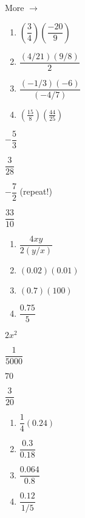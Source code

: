 \documentclass[11pt]{article}
\newcommand{\ds}{\displaystyle}
\begin{document}
\hfill More $\longrightarrow$

\newpage
\begin{multicols}{4}
\begin{enumerate}
\setcounter{enumi}{\theenumCount}
\item $\left(\dfrac{3}{4} \right) \left( \dfrac{-20}{9} \right)$
\item $\dfrac{(4/21)(9/8)}{2}$
\item $\dfrac{(-1/3)(-6)}{(-4/7)}$
\item $\ds \left(\frac{15}{8} \right) \left( \frac{44}{25} \right)$
\setcounter{enumCount}{\theenumi}
\end{enumerate}
\end{multicols}

\begin{multicols}{4}
\color{blue}
\begin{description}
\item \center $-\dfrac{5}{3}$
\item \center $\dfrac{3}{28}$
\item \center $-\dfrac{7}{2}$ (repeat!)
\item \center $\dfrac{33}{10}$
\setcounter{enumCount}{\theenumi}
\end{description}
\end{multicols}
\vfill

\begin{multicols}{4}
\begin{enumerate}
\setcounter{enumi}{\theenumCount}
\item $\dfrac{4xy}{2(y/x)}$
\item $(0.02)(0.01)$
\item $(0.7)(100)$
\item $\dfrac{0.75}{ 5 }$
\setcounter{enumCount}{\theenumi}
\end{enumerate}
\end{multicols}

\begin{multicols}{4}
\color{blue}
\begin{description}
\item \center $2x^2$
\item \center $\dfrac{1}{5000}$
\item \center $70$
\item \center $\dfrac{3}{20}$
\setcounter{enumCount}{\theenumi}
\end{description}
\end{multicols}
\vfill

\begin{multicols}{4}
\begin{enumerate}
\setcounter{enumi}{\theenumCount}
\item $\dfrac{1}{4}(0.24)$
\item $\dfrac{0.3}{0.18}$
\item $\dfrac{0.064}{0.8}$
\item $\dfrac{0.12}{ 1/5 }$
\setcounter{enumCount}{\theenumi}
\end{enumerate}
\end{multicols}
\end{document}
